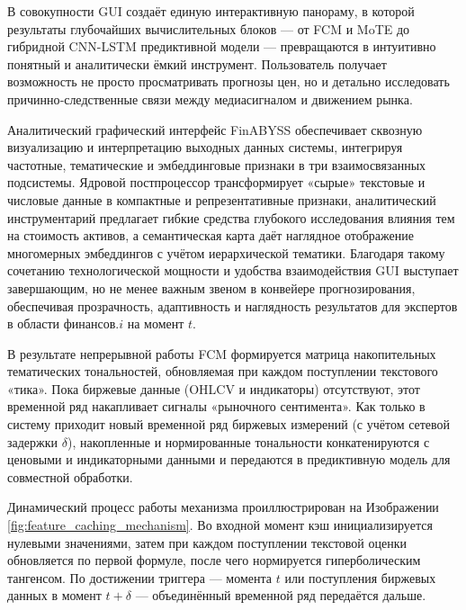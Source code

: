 В совокупности GUI создаёт единую интерактивную панораму, в которой результаты глубочайших вычислительных блоков
--- от FCM и MoTE до гибридной CNN-LSTM предиктивной модели — превращаются в интуитивно понятный и аналитически
ёмкий инструмент. Пользователь получает возможность не просто просматривать прогнозы цен, но и детально исследовать
причинно‑следственные связи между медиасигналом и движением рынка.

Аналитический графический интерфейс FinABYSS обеспечивает сквозную визуализацию и интерпретацию выходных данных
системы, интегрируя частотные, тематические и эмбеддинговые признаки в три взаимосвязанных подсистемы. Ядровой
постпроцессор трансформирует «сырые» текстовые и числовые данные в компактные и репрезентативные признаки,
аналитический инструментарий предлагает гибкие средства глубокого исследования влияния тем на стоимость активов,
а семантическая карта даёт наглядное отображение многомерных эмбеддингов с учётом иерархической тематики.
Благодаря такому сочетанию технологической мощности и удобства взаимодействия GUI выступает завершающим,
но не менее важным звеном в конвейере прогнозирования, обеспечивая прозрачность, адаптивность и наглядность
результатов для экспертов в области финансов.$i$ на момент $t$.

В результате непрерывной работы FCM формируется матрица накопительных тематических тональностей,
обновляемая при каждом поступлении текстового «тика». Пока биржевые данные (OHLCV и индикаторы)
отсутствуют, этот временной ряд накапливает сигналы «рыночного сентимента». Как только в систему
приходит новый временной ряд биржевых измерений (с учётом сетевой задержки $\delta$), накопленные
и нормированные тональности конкатенируются с ценовыми и индикаторными данными и передаются
в предиктивную модель для совместной обработки.

Динамический процесс работы механизма проиллюстрирован на Изображении \ref{fig:feature_caching_mechanism}.
Во входной момент кэш инициализируется нулевыми значениями, затем при каждом поступлении текстовой оценки
обновляется по первой формуле, после чего нормируется гиперболическим тангенсом. По достижении триггера ---
момента $t$ или поступления биржевых данных в момент $t+\delta$ --- объединённый временной ряд передаётся дальше.
